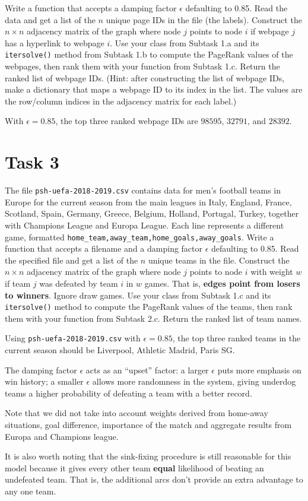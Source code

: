\documentclass[a4paper,10pt]{article}
\begin{document}
Write a function that accepts a damping factor \(\epsilon\) defaulting
to 0.85. Read the data and get a list of the \(n\) unique page IDs in
the file (the labels). Construct the \(n\times n\) adjacency matrix of
the graph where node \(j\) points to node \(i\) if webpage \(j\) has a
hyperlink to webpage \(i\). Use your class from Subtask 1.a and its
\texttt{itersolve()} method from Subtask 1.b to compute the PageRank
values of the webpages, then rank them with your function from Subtask
1.c. Return the ranked list of webpage IDs. (Hint: after constructing
the list of webpage IDs, make a dictionary that maps a webpage ID to its
index in the list. The values are the row/column indices in the
adjacency matrix for each label.)

With \(\epsilon=0.85\), the top three ranked webpage IDs are \(98595\),
\(32791\), and \(28392\).

\section*{Task 3}

The file \texttt{psh-uefa-2018-2019.csv} contains data for men's
football teams in Europe for the current season from the main leagues in
Italy, England, France, Scotland, Spain, Germany, Greece, Belgium,
Holland, Portugal, Turkey, together with Champions League and Europa
League. Each line represents a different game, formatted
\texttt{home\_team,away\_team,home\_goals,away\_goals}. Write a function that accepts a
filename and a damping factor \(\epsilon\) defaulting to 0.85. Read the
specified file and get a list of the \(n\)
unique teams in the file. Construct the \(n\times n\) adjacency matrix
of the graph where node \(j\) points to node \(i\) with weight \(w\) if
team \(j\) was defeated by team \(i\) in \(w\) games. That is,
\textbf{edges point from losers to winners}. Ignore draw games. Use your class from Subtask 1.c
 and its \texttt{itersolve()} method to compute the PageRank values of
the teams, then rank them with your function from Subtask 2.c. Return
the ranked list of team names.

Using \texttt{psh-uefa-2018-2019.csv} with \(\epsilon=0.85\),
the top three ranked teams in the current season should be
Liverpool, Athletic Madrid, Paris SG.

The damping factor \(\epsilon\) acts as an ``upset'' factor: a
larger \(\epsilon\) puts more emphasis on win history; a
smaller \(\epsilon\) allows more randomness in the system, giving
underdog teams a higher probability of defeating a team with a better
record.

Note that we did not take into account weights derived from home-away
situations, goal difference, importance of the match and aggregate
results from Europa and Champions league.

It is also worth noting that the sink-fixing procedure is still
reasonable for this model because it gives every other team
\textbf{equal} likelihood of beating an undefeated team. That is, the
additional arcs don't provide an extra advantage to any one team.
\end{document}
